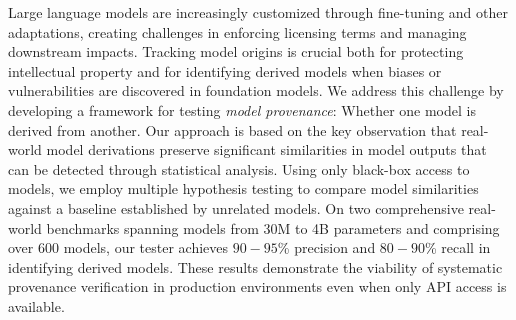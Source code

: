 Large language models are increasingly customized through fine-tuning and other adaptations, creating challenges in enforcing licensing terms and managing downstream impacts. Tracking model origins is crucial both for protecting intellectual property and for identifying derived models when biases or vulnerabilities are discovered in foundation models.
We address this challenge by developing a framework for testing {\textit{model provenance}}: Whether one model is derived from another. 
Our approach is based on the key observation that real-world model derivations preserve significant similarities in model outputs that can be detected through statistical analysis. Using only black-box access to models, we employ multiple hypothesis testing to compare model similarities against a baseline established by unrelated models.
On two comprehensive real-world benchmarks spanning models from 30M to 4B parameters and comprising over $600$ models, our tester achieves $90-95$\% precision and $80-90$\% recall in identifying derived models.
These results demonstrate the viability of systematic provenance verification in production environments even when only API access is available.